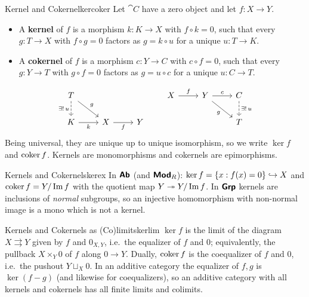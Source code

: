 \begin{definition}{Kernel and Cokernel}{kercoker}
    Let $\cat{C}$ have a zero object and let $f:X\to Y$.
    \begin{itemize}
        \item A \textbf{kernel} of $f$ is a morphism $k:K\to X$ with $f\circ k=0$, such that every $g:T\to X$ with $f\circ g=0$ factors as $g=k\circ u$ for a unique $u:T\to K$.
        \item A \textbf{cokernel} of $f$ is a morphism $c:Y\to C$ with $c\circ f=0$, such that every $g:Y\to T$ with $g\circ f=0$ factors as $g=u\circ c$ for a unique $u:C\to T$.
    \end{itemize}
    \[
    \begin{tikzcd}
    T \arrow[dr,"g"] \arrow[d,dashed,"\exists!\,u"'] & & \\
    K \arrow[r,"k"'] & X \arrow[r,"f"'] & Y
    \end{tikzcd}
    \qquad
    \begin{tikzcd}
    X \arrow[r,"f"] & Y \arrow[r,"c"] \arrow[dr,"g"'] & C \arrow[d,dashed,"\exists!\,u"] \\
    & & T
    \end{tikzcd}
    \]
    Being universal, they are unique up to unique isomorphism, so we write $\ker f$ and $\operatorname{coker} f$. Kernels are monomorphisms and cokernels are epimorphisms.
\end{definition}

\begin{example}{Kernels and Cokernels}{kerex}
    In $\bm{\mathsf{Ab}}$ (and $\bm{\mathsf{Mod}}_R$): $\ker f=\{x:f(x)=0\}\hookrightarrow X$ and $\operatorname{coker} f=Y/\operatorname{Im} f$ with the quotient map $Y\twoheadrightarrow Y/\operatorname{Im} f$. In $\bm{\mathsf{Grp}}$ kernels are inclusions of \emph{normal} subgroups, so an injective homomorphism with non-normal image is a mono which is not a kernel.
\end{example}

\begin{remark}{Kernels and Cokernels as (Co)limits}{kerlim}
    $\ker f$ is the limit of the diagram $X\rightrightarrows Y$ given by $f$ and $0_{X,Y}$, i.e.\ the equalizer of $f$ and $0$; equivalently, the pullback $X\times_Y0$ of $f$ along $0\to Y$. Dually, $\operatorname{coker} f$ is the coequalizer of $f$ and $0$, i.e.\ the pushout $Y\sqcup_X0$. In an additive category the equalizer of $f,g$ is $\ker(f-g)$ (and likewise for coequalizers), so an additive category with all kernels and cokernels has all finite limits and colimits.
\end{remark}

